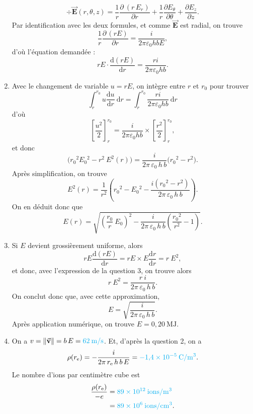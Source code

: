 \documentclass[a4paper, 10pt]{article}
\makeatletter
\let\@vec\vec
\renewcommand{\vec}[1]{\ensuremath{\@vec{\mathbf{#1}}}}
\def\res#1{{\color{cyan}#1}}
\makeatother
\begin{document}
\begin{multicols}{2}
\begin{enumerate}
\[					\div \vec{E}(r, \theta, z) = \frac{1}{r} \frac{\partial\: (r\,E_r)}{\partial r} + \frac{1}{r} \frac{\partial E_\theta}{\partial \theta} + \frac{\partial E_z}{\partial z}
				.\]
				Par identification avec les deux formules, et comme $\vec{E}$\/ est radial, on trouve \[
					\frac{1}{r} \frac{\partial\, (rE)}{\partial r} = \frac{i}{2\pi\varepsilon_0 h b E}
				,\] d'où l'équation demandée : \[
				\boxed{rE\cdot \frac{\mathrm{d}(rE)}{\mathrm{d}r} = \frac{ri}{2\pi \varepsilon_0 hb}.}
				\]
			\item Avec le changement de variable $u = r E$, on intègre entre $r$\/ et $r_0$\/ pour trouver \[
					\int_{r}^{r_0} u \frac{\mathrm{d}u}{\mathrm{d}r}~\mathrm{d}r = \int_{r}^{r_0} \frac{ri}{2\pi\varepsilon_0 hb}~\mathrm{d}r
				\] d'où \[
				\left[ \frac{u^2}{2} \right]_r^{r_0} = \frac{i}{2\pi\varepsilon_0 hb} \times \left[ \frac{r^2}{2} \right]_r^{r_0},
				\] et donc \[
				\big(r_0{}^2 E_0{}^2 - r^2\:E^2(r)\big) = \frac{i}{2\pi\,\varepsilon_0\, h\, b}\big(r_0{}^2 - r^2)
				.\]
				Après simplification, on trouve \[
					E^2(r) = \frac{1}{r^2} \left( r_0{}^2 - E_0{}^2 - \frac{i(r_0{}^2 - r^2)}{2\pi\, \varepsilon_0\, h\,b} \right)
				.\] On en déduit donc que \[
					\boxed{E(r) = \sqrt{\left(\frac{r_0}{r}\: E_0\right)^2 - \frac{i}{2\pi\,\varepsilon_0\, h\,b} \left( \frac{r_0{}^2}{r^2} - 1 \right) }.}
				\] 
			\item Si $E$\/ devient grossièrement uniforme, alors \[
					rE\frac{\mathrm{d}(rE)}{\mathrm{d}r} = rE \times E \frac{\mathrm{d}r}{\mathrm{d}r} = r\:E^2
				,\] et donc, avec l'expression de la question 3, on trouve alors \[
					r\:E^2 = \frac{r\:i}{2\pi\, \varepsilon_0\, h\, b}
				.\] On conclut donc que, avec cette approximation, \[
					\boxed{E = \sqrt{\frac{i}{2\pi\,\varepsilon_0\, h\,b}}.}
				\] Après application numérique, on trouve \res{$E = 0{,}20\:\mathrm{MJ}$}.
			\item On a $v = \|\vec{v}\| = b\, E = \res{62\:\mathrm{m}/\mathrm{s}}$.
				Et, d'après la question 2, on a \[
					\rho(r_\mathrm{e}) = -\frac{i}{2\pi\, r_\mathrm{e} \,h\,b\,E} = \res{-1{,}4 \times10^{-5}\:\mathrm{C}/\mathrm{m}^3}
				.\] Le nombre d'ions par centimètre cube est
				\begin{align*}
					\frac{\rho(r_\mathrm{e})}{-e} &= \res{89 \times 10^{12}\:\mathrm{ions}/\mathrm{m}^3}\\
					&= \res{89 \times 10^6\:\mathrm{ions}/\mathrm{cm}^3}. \\
				\end{align*}
		\end{enumerate}

\end{multicols}
\end{document}
